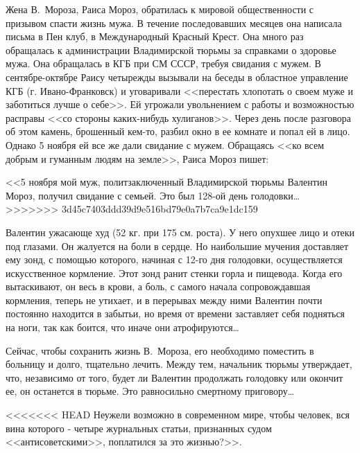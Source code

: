 \documentclass{book}
\begin{document}
Жена В.~Мороза, Раиса Мороз, обратилась к мировой общественности с призывом спасти жизнь мужа. В течение последовавших месяцев она написала письма в Пен клуб, в Международный Красный Крест. Она много раз обращалась к администрации Владимирской тюрьмы за справками о здоровье мужа. Она обращалась в КГБ при СМ СССР, требуя свидания с мужем. В сентябре-октябре Раису четырежды вызывали на бесе­ды в областное управление КГБ (г. Ивано-Франковск) и уговаривали <<перестать хлопотать о своем муже и заботиться лучше о себе>>. Ей угрожали увольнением с работы и возможностью расправы <<со стороны каких-нибудь хулиганов>>. Через день после разговора об этом камень, брошенный кем-то, разбил окно в ее комнате и попал ей в лицо. Однако 5 ноября ей все же дали свидание с мужем. Обращаясь <<ко всем добрым и гуманным людям на земле>>, Раиса Мороз пишет:

<<5 ноября мой муж, политзаключенный Владимирской тюрьмы Валентин Мороз, получил свидание с семьей. Это был 128-ой день голодовки\ldots
>>>>>>> 3d45c7403ddd39d9e516bd79e0a7b7ca9e1dc159

Валентин ужасающе худ (52 кг. при 175 см. роста). У него опухшее лицо и отеки под глазами. Он жалуется на боли в сердце. Но наибольшие мучения доставляет ему зонд, с помощью которого, начиная с 12-го дня голодовки, осуществляется искусственное кормление. Этот зонд ранит стенки горла и пищевода. Когда его вытаскивают, он весь в крови, а боль, с самого начала сопровождавшая кормления, теперь не утихает, и в перерывах между ними Валентин почти постоянно находится в забытьи, но время от времени заставляет себя подняться на ноги, так как боится, что иначе они атрофируются\ldots

Сейчас, чтобы сохранить жизнь В.~Мороза, его необходимо поместить в больницу и долго, тщательно лечить. Между тем, начальник тюрьмы утверждает, что, независимо от того, будет ли Валентин продолжать голодовку или окончит ее, он останется в тюрьме. Это равносильно смертному приговору\ldots

<<<<<<< HEAD
Неужели возможно в современном мире, чтобы человек, вся вина которого ‑ четыре журнальных статьи, признанных судом <<антисоветскими>>, поплатился за это жизнью?>>.
\end{document}
